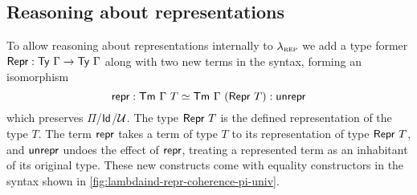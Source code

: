 \subsection{Reasoning about representations} \label{sub:reasoningrep}

To allow reasoning about representations internally to $\lambda_{\textsc{rep}}$ we add a
type former $\textsf{Repr}{} : \textsf{Ty}\ \Gamma \to \textsf{Ty}\ \Gamma$
along with two new terms in the syntax, forming an isomorphism
\begin{equation}\label{eq:repr-iso}
	\textsf{repr}{} : \textsf{Tm}\ \Gamma\ T \simeq \textsf{Tm}\ \Gamma\ (\textsf{Repr}\ T) : \textsf{unrepr}{}
\end{equation}
which preserves $\Pi$/$\textsf{Id}$/$\mathcal{U}$. The type $\MRepr\ T$ is the
defined representation of the type $T$. The term $\textsf{repr}{}$ takes a term of type
$T$ to its representation of type
$\MRepr\ T$, and $\textsf{unrepr}{}$ undoes the effect of $\textsf{repr}{}$, treating a
represented term as an inhabitant of its original type. These new constructs
come with equality constructors in the syntax
shown in \cref{fig:lambdaind-repr-coherence-pi-univ}.
